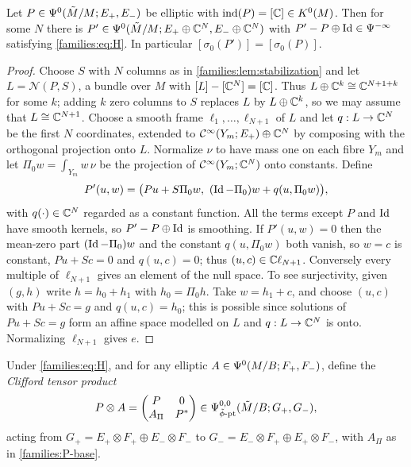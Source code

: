 \begin{lemma}\label{families:lem:normalize-P}
  Let $P\in\Psi^{0}(\tilde M/M;E_+,E_-)$ be elliptic with $\operatorname{ind}(P)=[\mathbb{C}]\in
  K^0(M)$. Then for some $N$ there is $P'\in\Psi^{0}(\tilde M/M;E_+\oplus\mathbb{C}^N,
  E_-\oplus\mathbb{C}^N)$ with $P'-P\oplus\operatorname{Id}\in\Psi^{-\infty}$ satisfying
  \eqref{families:eq:H}. In particular $[\sigma_0(P')]=[\sigma_0(P)]$.
\end{lemma}
\begin{proof}
  Choose $S$ with $N$ columns as in \cref{families:lem:stabilization} and let
  $L=\mathcal N(P,S)$, a bundle over $M$ with $[L]-[\mathbb{C}^N]=[\mathbb{C}]$. Thus
  $L\oplus\mathbb{C}^k\cong\mathbb{C}^{N+1+k}$ for some $k$; adding $k$ zero columns to $S$
  replaces $L$ by $L\oplus\mathbb{C}^k$, so we may assume that $L\cong\mathbb{C}^{N+1}$. Choose
  a smooth frame $\ell_1,\dots,\ell_{N+1}$ of $L$ and let $q:L\to\mathbb{C}^N$ be the
  first $N$ coordinates, extended to $\mathcal{C}^\infty(Y_m;E_+)\oplus\mathbb{C}^N$ by composing with
  the orthogonal projection onto $L$. Normalize $\nu$ to have mass one on each
  fibre $Y_m$ and let $\Pi_0w=\int_{Y_m}w\,\nu$ be the projection of
  $\mathcal{C}^\infty(Y_m;\mathbb{C}^N)$ onto constants. Define
  \begin{equation*}
    P'(u,w)=\bigl(Pu+S\Pi_0w,\ (\Id-\Pi_0)w+q(u,\Pi_0w)\bigr),
  \end{equation*}
  with $q(\cdot)\in\mathbb{C}^N$ regarded as a constant function. All the terms except
  $P$ and $\operatorname{Id}$ have smooth kernels, so $P'-P\oplus\operatorname{Id}$ is smoothing. If
  $P'(u,w)=0$ then the mean-zero part $(\operatorname{Id}-\Pi_0)w$ and the constant
  $q(u,\Pi_0w)$ both vanish, so $w=c$ is constant, $Pu+Sc=0$ and $q(u,c)=0$;
  thus $(u,c)\in\mathbb{C}\ell_{N+1}$. Conversely every multiple of $\ell_{N+1}$ gives
  an element of the null space. To see surjectivity, given $(g,h)$ write
  $h=h_0+h_1$ with $h_0=\Pi_0h$. Take $w=h_1+c$, and choose $(u,c)$ with
  $Pu+Sc=g$ and $q(u,c)=h_0$; this is possible since solutions of $Pu+Sc=g$
  form an affine space modelled on $L$ and $q:L\to\mathbb{C}^N$ is onto. Normalizing
  $\ell_{N+1}$ gives $e$.
\end{proof}

Under \eqref{families:eq:H}, and for any elliptic $A\in\Psi^{0}(M/B;F_+,F_-)$,
define the \emph{Clifford tensor product}
\begin{equation}\label{families:eq:PA}
  P\otimes A=\begin{pmatrix}P&0\\A_\Pi&P^*\end{pmatrix}\in
  \Psi^{0,0}_{\tilde\phi\text{-}\mathrm{pt}}(\tilde M/B;G_+,G_-),
\end{equation}
acting from $G_+=E_+\otimes F_+\oplus E_-\otimes F_-$ to
$G_-=E_-\otimes F_+\oplus E_+\otimes F_-$, with $A_\Pi$ as in
\ref{families:P-base}.

